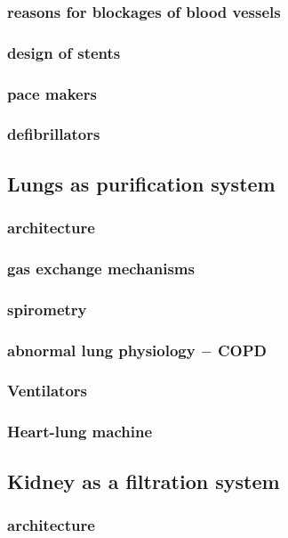 \documentclass{article}
\begin{document}
	\subsubsection{reasons for blockages of blood vessels}
	\subsubsection{design of stents}
	\subsubsection{pace makers}
	\subsubsection{defibrillators}

	\subsection{Lungs as purification system}
	\subsubsection{architecture}
	\subsubsection{gas exchange mechanisms}
	\subsubsection{spirometry}
	\subsubsection{abnormal lung physiology $-$ COPD}
	\subsubsection{Ventilators}
	\subsubsection{Heart-lung machine}

	\subsection{Kidney as a filtration system}
	\subsubsection{architecture}
\end{document}
